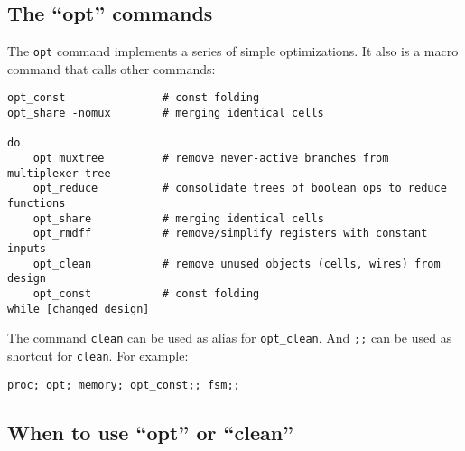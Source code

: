
\subsection{The ``opt'' commands}

\begin{frame}[fragile]{\subsecname}
The {\tt opt} command implements a series of simple optimizations. It also
is a macro command that calls other commands:

\begin{lstlisting}[xleftmargin=0.5cm, basicstyle=\ttfamily\fontsize{8pt}{10pt}\selectfont]
opt_const               # const folding
opt_share -nomux        # merging identical cells

do
    opt_muxtree         # remove never-active branches from multiplexer tree
    opt_reduce          # consolidate trees of boolean ops to reduce functions
    opt_share           # merging identical cells
    opt_rmdff           # remove/simplify registers with constant inputs
    opt_clean           # remove unused objects (cells, wires) from design
    opt_const           # const folding
while [changed design]
\end{lstlisting}

The command {\tt clean} can be used as alias for {\tt opt\_clean}. And {\tt ;;}
can be used as shortcut for {\tt clean}. For example:

\begin{lstlisting}[xleftmargin=0.5cm, basicstyle=\ttfamily\fontsize{8pt}{10pt}\selectfont]
proc; opt; memory; opt_const;; fsm;;
\end{lstlisting}
\end{frame}


\subsection{When to use ``opt'' or ``clean''}

